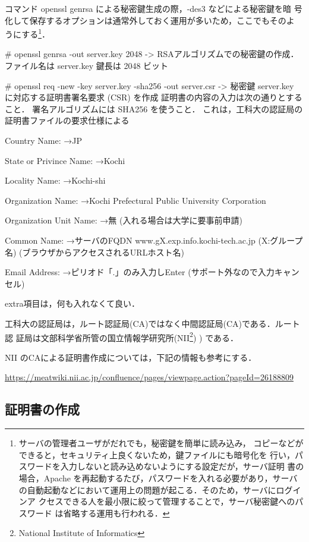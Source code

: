 コマンド openssl genrsa による秘密鍵生成の際，-des3 などによる秘密鍵を暗
号化して保存するオプションは通常外しておく運用が多いため，ここでもそのよ
うにする\footnote{サーバの管理者ユーザがだれでも，秘密鍵を簡単に読み込み，
コピーなどができると，セキュリティ上良くないため，鍵ファイルにも暗号化を
行い，パスワードを入力しないと読み込めないようにする設定だが，サーバ証明
書の場合，Apache を再起動するたび，パスワードを入れる必要があり，サーバ
の自動起動などにおいて運用上の問題が起こる．そのため，サーバにログインア
クセスできる人を最小限に絞って管理することで，サーバ秘密鍵へのパスワード
は省略する運用も行われる．}．

\begin{cli}
# openssl genrsa -out server.key 2048
-> RSAアルゴリズムでの秘密鍵の作成．ファイル名は server.key 鍵長は 2048 ビット

# openssl req -new -key server.key -sha256 -out server.csr
-> 秘密鍵 server.key に対応する証明書署名要求 (CSR) を作成
  証明書の内容の入力は次の通りとすること．
  署名アルゴリズムには SHA256 を使うこと．
  これは，工科大の認証局の証明書ファイルの要求仕様による

Country Name:
→JP

State or Privince Name:
→Kochi

Locality Name:
→Kochi-shi

Organization Name:
→Kochi Prefectural Public University Corporation

Organization Unit Name:
→無
(入れる場合は大学に要事前申請)

Common Name:
→サーバのFQDN
   www.gX.exp.info.kochi-tech.ac.jp
   (X:グループ名)
  (ブラウザからアクセスされるURLホスト名)

Email Address:
→ピリオド「.」のみ入力しEnter
 (サポート外なので入力キャンセル)

extra項目は，何も入れなくて良い．

\end{cli}

工科大の認証局は，ルート認証局(CA)ではなく中間認証局(CA)である．ルート認
証局は文部科学省所管の国立情報学研究所(NII\footnote{National Institute 
of Informatics}) ) である．

NII のCAによる証明書作成については，下記の情報も参考にする．

\url{https://meatwiki.nii.ac.jp/confluence/pages/viewpage.action?pageId=26188809}

\subsection{証明書の作成}

